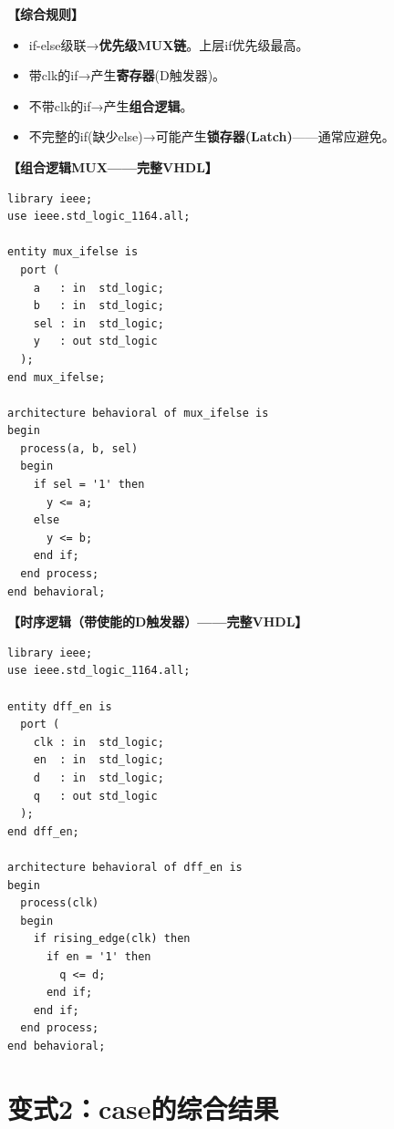 \begin{detailbox}[完整教学]
\textbf{【综合规则】}
\begin{itemize}
  \item if-else级联→\textbf{优先级MUX链}。上层if优先级最高。
  \item 带clk的if→产生\textbf{寄存器}(D触发器)。
  \item 不带clk的if→产生\textbf{组合逻辑}。
  \item 不完整的if(缺少else)→可能产生\textbf{锁存器(Latch)}——通常应避免。
\end{itemize}

\textbf{【组合逻辑MUX——完整VHDL】}
\begin{lstlisting}[caption={if-else综合为组合逻辑MUX}]
library ieee;
use ieee.std_logic_1164.all;

entity mux_ifelse is
  port (
    a   : in  std_logic;
    b   : in  std_logic;
    sel : in  std_logic;
    y   : out std_logic
  );
end mux_ifelse;

architecture behavioral of mux_ifelse is
begin
  process(a, b, sel)
  begin
    if sel = '1' then
      y <= a;
    else
      y <= b;
    end if;
  end process;
end behavioral;
\end{lstlisting}

\textbf{【时序逻辑（带使能的D触发器）——完整VHDL】}
\begin{lstlisting}[caption={if+clk综合为带使能的D触发器}]
library ieee;
use ieee.std_logic_1164.all;

entity dff_en is
  port (
    clk : in  std_logic;
    en  : in  std_logic;
    d   : in  std_logic;
    q   : out std_logic
  );
end dff_en;

architecture behavioral of dff_en is
begin
  process(clk)
  begin
    if rising_edge(clk) then
      if en = '1' then
        q <= d;
      end if;
    end if;
  end process;
end behavioral;
\end{lstlisting}
\end{detailbox}


\section{变式2：case的综合结果}


